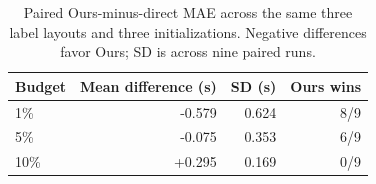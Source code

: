 \begin{table}[t]
\centering\footnotesize\setlength{\tabcolsep}{3pt}
\caption{Paired Ours-minus-direct MAE across the same three label layouts and three initializations. Negative differences favor Ours; SD is across nine paired runs.}\label{tab:paired}
\begin{tabular}{lrrr}\toprule
Budget & Mean difference (s) & SD (s) & Ours wins\\\midrule
1\% & -0.579 & 0.624 & 8/9\\
5\% & -0.075 & 0.353 & 6/9\\
10\% & +0.295 & 0.169 & 0/9\\
\bottomrule\end{tabular}
\end{table}
